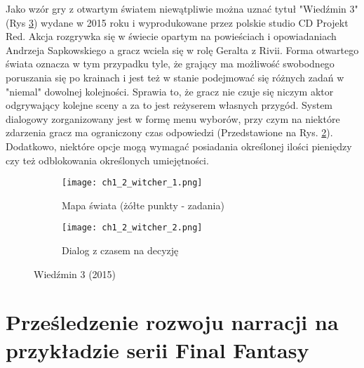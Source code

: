 \newpage

Jako wzór gry z otwartym światem niewątpliwie można uznać tytuł "Wiedźmin 3" (Rys \ref{fig:ch1_2_witcher})
wydane w 2015 roku i wyprodukowane przez polskie studio CD Projekt Red. Akcja rozgrywka się w świecie
opartym na powieściach i opowiadaniach Andrzeja Sapkowskiego a gracz wciela się w rolę Geralta z Rivii.
Forma otwartego świata oznacza w tym przypadku tyle, że grający ma możliwość swobodnego poruszania się
po krainach i jest też w stanie podejmować się różnych zadań w "niemal" dowolnej kolejności. Sprawia to, że
gracz nie czuje się niczym aktor odgrywający kolejne sceny a za to jest reżyserem własnych przygód.
System dialogowy zorganizowany jest w formę menu wyborów, przy czym na niektóre zdarzenia gracz ma
ograniczony czas odpowiedzi (Przedstawione na Rys. \ref{subfig:ch_1_2_witcher_2}). Dodatkowo, niektóre
opcje mogą wymagać posiadania określonej ilości pieniędzy czy też odblokowania określonych umiejętności.

\begin{figure}[h]
    \begin{subfigure}{0.49\textwidth}
        \caption{Mapa świata (żółte punkty - zadania)}
        \texttt{[image: ch1\_2\_witcher\_1.png]}
        \label{subfig:ch_1_2_witcher_1}
    \end{subfigure}
    \begin{subfigure}{0.49\textwidth}
        \caption{Dialog z czasem na decyzję}
        \texttt{[image: ch1\_2\_witcher\_2.png]}
        \label{subfig:ch_1_2_witcher_2}
    \end{subfigure}
    \caption{Wiedźmin 3 (2015)}
    \label{fig:ch1_2_witcher}
\end{figure}

\newpage

\section{Prześledzenie rozwoju narracji na przykładzie serii Final Fantasy}\label{subsection:ch1_3}


